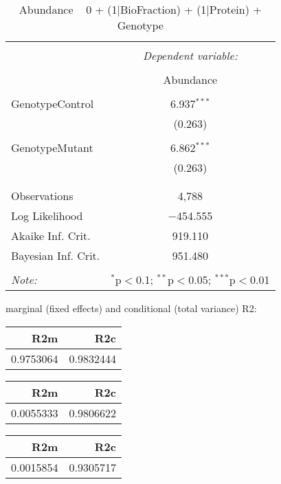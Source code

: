 \documentclass[11pt]{report}
\begin{document}
\begin{table}[!htbp] \centering 
  \caption{Abundance ~ 0 + (1|BioFraction) + (1|Protein) + Genotype} 
  \label{} 
\begin{tabular}{@{\extracolsep{5pt}}lc} 
\\[-1.8ex]\hline 
\hline \\[-1.8ex] 
 & \multicolumn{1}{c}{\textit{Dependent variable:}} \\ 
\cline{2-2} 
\\[-1.8ex] & Abundance \\ 
\hline \\[-1.8ex] 
 GenotypeControl & 6.937$^{***}$ \\ 
  & (0.263) \\ 
  & \\ 
 GenotypeMutant & 6.862$^{***}$ \\ 
  & (0.263) \\ 
  & \\ 
\hline \\[-1.8ex] 
Observations & 4,788 \\ 
Log Likelihood & $-$454.555 \\ 
Akaike Inf. Crit. & 919.110 \\ 
Bayesian Inf. Crit. & 951.480 \\ 
\hline 
\hline \\[-1.8ex] 
\textit{Note:}  & \multicolumn{1}{r}{$^{*}$p$<$0.1; $^{**}$p$<$0.05; $^{***}$p$<$0.01} \\ 
\end{tabular} 
\end{table} 
marginal (fixed effects) and conditional (total variance) R2:

\begin{tabular}{r|r}
\hline
R2m & R2c\\
\hline
0.9753064 & 0.9832444\\
\hline
\end{tabular}

\begin{tabular}{r|r}
\hline
R2m & R2c\\
\hline
0.0055333 & 0.9806622\\
\hline
\end{tabular}

\begin{tabular}{r|r}
\hline
R2m & R2c\\
\hline
0.0015854 & 0.9305717\\
\hline
\end{tabular}
\end{document}
